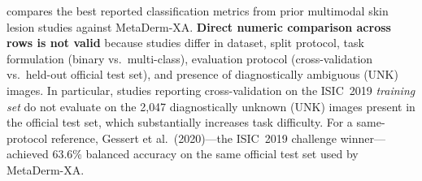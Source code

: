 \documentclass[12pt, a4paper]{article}
\begin{document}
 compares the best reported classification metrics from prior multimodal skin lesion studies against MetaDerm-XA. \textbf{Direct numeric comparison across rows is not valid} because studies differ in dataset, split protocol, task formulation (binary vs.\ multi-class), evaluation protocol (cross-validation vs.\ held-out official test set), and presence of diagnostically ambiguous (UNK) images. In particular, studies reporting cross-validation on the ISIC~2019 \emph{training set} do not evaluate on the 2{,}047 diagnostically unknown (UNK) images present in the official test set, which substantially increases task difficulty. For a same-protocol reference, Gessert et al.\ (2020)---the ISIC~2019 challenge winner---achieved 63.6\% balanced accuracy on the same official test set used by MetaDerm-XA.
\end{document}
